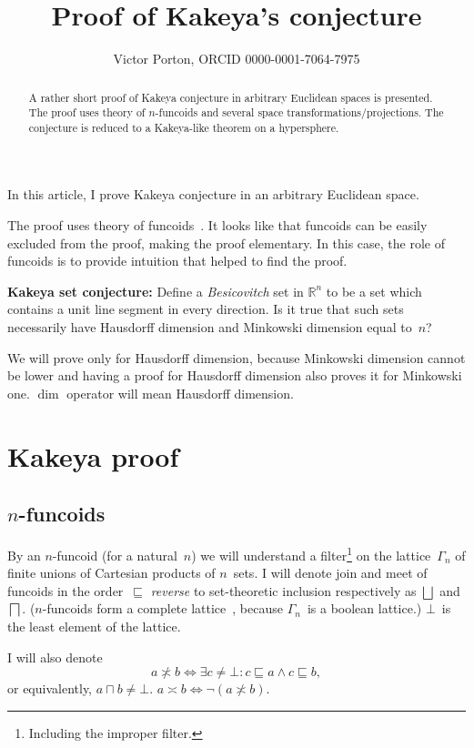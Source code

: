 \documentclass[oneside,draft]{amsart}
\title{Proof of Kakeya's conjecture}
\author{Victor Porton, ORCID 0000-0001-7064-7975}
\newcommand{\intrs}{\not\asymp}
\newcommand{\nintrs}{\asymp}
\begin{document}
\begin{abstract}
A rather short proof of Kakeya conjecture in arbitrary Euclidean spaces is presented. The proof uses theory of $n$-fun\-co\-ids and several space transformations/projections. The conjecture is reduced to a Ka\-ke\-ya-li\-ke theorem on a hypersphere.
\end{abstract}

\maketitle  

In this article, I prove Kakeya conjecture in an arbitrary Euclidean space.

The proof uses theory of funcoids~\cite{volume-1}. It looks like that funcoids can be easily excluded from the proof, making the proof elementary. In this case, the role of funcoids is to provide intuition that helped to find the proof.

\textbf{Kakeya set conjecture:} \cite{kakeya-long,tao-blog-kakeya} Define a \emph{Besicovitch} set in $\mathbb{R}^n$ to be a set which contains a unit line segment in every direction. Is it true that such sets necessarily have Hausdorff dimension and Minkowski dimension equal to~$n$?

We will prove only for Hausdorff dimension, because Minkowski dimension cannot be lower and having a proof for Hausdorff dimension also proves it for Minkowski one. $\dim$ operator will mean Hausdorff dimension.

\section{Kakeya proof}

\subsection{$n$-fun\-co\-ids}

By an $n$-fun\-co\-id (for a natural~$n$) we will understand a filter\footnote{Including the improper filter.} on the lattice~$\Gamma_n$ of finite unions of Cartesian products of $n$~sets. I will denote join and meet of funcoids in the order~$\sqsubseteq$ \emph{reverse} to set-the\-o\-re\-tic inclusion respectively as $\bigsqcup$ and $\bigsqcap$. ($n$-fun\-co\-ids form a complete lattice~\cite{volume-1}, because $\Gamma_n$~is a boolean lattice.) $\bot$~is the least element of the lattice.

I will also denote \[ a\intrs b \Leftrightarrow \exists c\ne\bot: c\sqsubseteq a\land c\sqsubseteq b, \] or equivalently, $a\sqcap b\ne\bot$.
$a\nintrs b\Leftrightarrow\lnot(a\intrs b)$.
\end{document}
